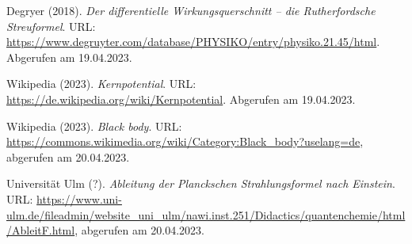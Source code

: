 \begin{thebibliography}{99}
     Degryer (2018). \emph{Der differentielle Wirkungsquerschnitt – die Rutherfordsche Streuformel}. URL: \url{https://www.degruyter.com/database/PHYSIKO/entry/physiko.21.45/html}. Abgerufen am 19.04.2023. 

     Wikipedia (2023). \emph{Kernpotential}. URL: \url{https://de.wikipedia.org/wiki/Kernpotential}. Abgerufen am 19.04.2023. 

     Wikipedia (2023). \emph{Black body}. URL: \url{https://commons.wikimedia.org/wiki/Category:Black_body?uselang=de}, abgerufen am 20.04.2023.

     Universität Ulm (?). \emph{Ableitung der Planckschen Strahlungsformel nach Einstein}. URL: \url{https://www.uni-ulm.de/fileadmin/website_uni_ulm/nawi.inst.251/Didactics/quantenchemie/html/AbleitF.html}, abgerufen am 20.04.2023.
\end{thebibliography}